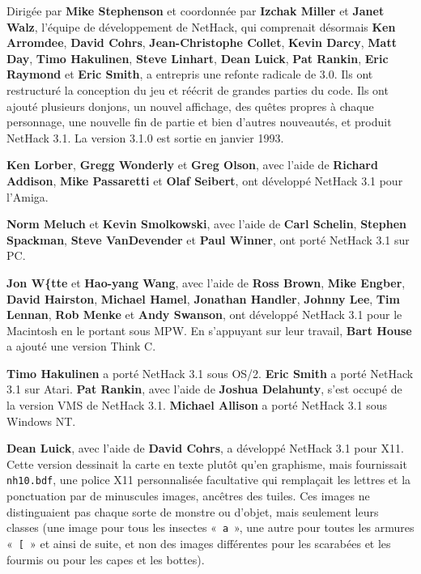 \documentclass[titlepage]{article}
\begin{document}
Dirigée par \textbf{Mike Stephenson} et coordonnée par \textbf{Izchak Miller} et
\textbf{Janet Walz}, l'équipe de développement de NetHack, qui comprenait
désormais \textbf{Ken Arromdee},
\textbf{David Cohrs}, \textbf{Jean-Christophe Collet}, \textbf{Kevin Darcy},
\textbf{Matt Day}, \textbf{Timo Hakulinen}, \textbf{Steve Linhart}, \textbf{Dean Luick},
\textbf{Pat Rankin}, \textbf{Eric Raymond} et \textbf{Eric Smith}, a entrepris une
refonte radicale de 3.0.
Ils ont restructuré la conception du jeu et réécrit de grandes parties du
code.
Ils ont ajouté plusieurs donjons, un nouvel affichage, des quêtes propres à
chaque personnage, une nouvelle fin de partie et bien d'autres nouveautés,
et produit NetHack 3.1.
La version 3.1.0 est sortie en janvier 1993.


\textbf{Ken Lorber}, \textbf{Gregg Wonderly} et \textbf{Greg Olson}, avec l'aide de
\textbf{Richard Addison}, \textbf{Mike Passaretti} et \textbf{Olaf Seibert}, ont
développé NetHack 3.1 pour l'Amiga.


\textbf{Norm Meluch} et \textbf{Kevin Smolkowski}, avec l'aide de
\textbf{Carl Schelin}, \textbf{Stephen Spackman}, \textbf{Steve VanDevender}
et \textbf{Paul Winner}, ont porté NetHack 3.1 sur PC.


\textbf{Jon W\{tte} et \textbf{Hao-yang Wang}, avec l'aide de \textbf{Ross Brown},
\textbf{Mike Engber}, \textbf{David Hairston}, \textbf{Michael Hamel},
\textbf{Jonathan Handler}, \textbf{Johnny Lee}, \textbf{Tim Lennan}, \textbf{Rob Menke}
et \textbf{Andy Swanson}, ont développé NetHack 3.1 pour le Macintosh en le
portant sous MPW.
En s'appuyant sur leur travail, \textbf{Bart House} a ajouté une version
Think C.


\textbf{Timo Hakulinen} a porté NetHack 3.1 sous OS/2.
\textbf{Eric Smith} a porté NetHack 3.1 sur Atari.
\textbf{Pat Rankin}, avec l'aide de \textbf{Joshua Delahunty}, s'est occupé de la
version VMS de NetHack 3.1.
\textbf{Michael Allison} a porté NetHack 3.1 sous Windows NT.


\textbf{Dean Luick}, avec l'aide de \textbf{David Cohrs}, a développé
NetHack 3.1 pour X11.
Cette version dessinait la carte en texte plutôt qu'en graphisme, mais
fournissait \texttt{nh10.bdf}, une police X11 personnalisée facultative qui
remplaçait les lettres et la ponctuation par de minuscules images,
ancêtres des tuiles.
Ces images ne distinguaient pas chaque sorte de monstre ou d'objet, mais
seulement leurs classes (une image pour tous les insectes «~\texttt{a}~»,
une autre pour toutes les armures «~\texttt{[}~» et ainsi de suite,
et non des images différentes pour les scarabées et les fourmis ou pour les
capes et les bottes).
\end{document}
